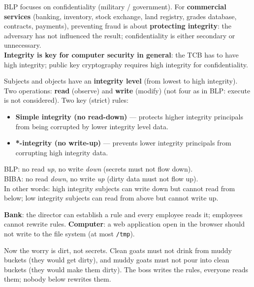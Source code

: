 \begin{rembox}[title=Why integrity?]
BLP focuses on confidentiality (military / government). For \textbf{commercial services}
(banking, inventory, stock exchange, land registry, grades database, contracts,
payments), preventing fraud is about \textbf{protecting integrity}: the adversary has not
influenced the result; confidentiality is either secondary or unnecessary. \\
\textbf{Integrity is key for computer security in general}: the TCB has to have high
integrity; public key cryptography requires high integrity for confidentiality.
\end{rembox}

\begin{defnbox}[title=BIBA model]
Subjects and objects have an \textbf{integrity level} (from lowest to high integrity).
Two operations: \textbf{read} (observe) and \textbf{write} (modify) (not four as in BLP:
execute is not considered). Two key (strict) rules:
\begin{itemize}
  \item \textbf{Simple integrity (no read-down)} --- protects higher integrity
        principals from being corrupted by lower integrity level data.
  \item \textbf{*-integrity (no write-up)} --- prevents lower integrity principals from
        corrupting high integrity data.
\end{itemize}
\end{defnbox}

\begin{rembox}[title=BIBA is the dual of BLP]
BLP: no read \emph{up}, no write \emph{down} (secrets must not flow down). \\
BIBA: no read \emph{down}, no write \emph{up} (dirty data must not flow up). \\
In other words: high integrity subjects can write down but cannot read from below; low integrity
subjects can read from above but cannot write up.
\end{rembox}

\begin{exbox}[title=BIBA illustrated]
\textbf{Bank}: the director can establish a rule and every employee reads it; employees
cannot rewrite rules. \textbf{Computer}: a web application open in the browser should not
write to the file system (at most \texttt{/tmp}).
\end{exbox}

\begin{goatbox}
Now the worry is dirt, not secrets. Clean goats must not drink from muddy buckets (they would get
dirty), and muddy goats must not pour into clean buckets (they would make them dirty). The boss
writes the rules, everyone reads them; nobody below rewrites them.
\end{goatbox}

